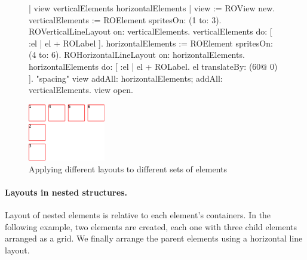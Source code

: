 \documentclass[a4paper,10pt,twoside]{book}
\begin{document}
\begin{figure}[H]
\label{fig:differentLayouts}
\vspace{0pt}
\begin{minipage}[t]{1\textwidth}
\begin{code}{}
| view verticalElements horizontalElements |
view := ROView new.
verticalElements := ROElement spritesOn: (1 to: 3).
ROVerticalLineLayout on: verticalElements.
verticalElements do: [ :el | el + ROLabel ].
horizontalElements := ROElement spritesOn: (4 to: 6).
ROHorizontalLineLayout on: horizontalElements.
horizontalElements do: [ :el |
	el + ROLabel.
	el translateBy: (60@ 0) ].	  "spacing"
view 
	addAll: horizontalElements; 
	addAll: verticalElements.
view open.
\end{code}
\end{minipage}  
\hfill
\begin{minipage}[t]{1\textwidth}
\vspace{0pt} \raggedright
\centering
\includegraphics[width=0.3\textwidth]{differentLayouts} 
\end{minipage}
\caption{Applying different layouts to different sets of elements}
\end{figure} 



\paragraph{Layouts in nested structures.}
Layout of nested elements is relative to each element's containers. In the following example, two elements are created, each one with three child elements arranged as a grid. We finally arrange the parent elements using a horizontal line layout.
\end{document}
